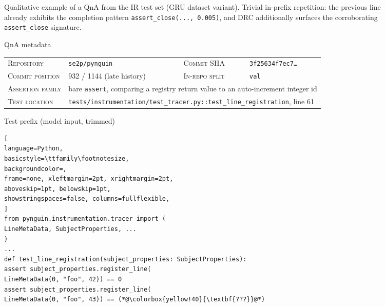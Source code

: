 \documentclass{llmxive}
\begin{document}
\begin{figure}[!htbp]
\begin{center}
\begin{tcolorbox}
\end{tcolorbox}
\caption{Qualitative example of a QnA from the IR test set (GRU dataset variant). Trivial in-prefix repetition: the previous line already exhibits the completion pattern \texttt{assert\_close(...,\,0.005)}, and DRC additionally surfaces the corroborating \texttt{assert\_close} signature.}
\label{fig:qualitative_ir_fla_46}
\end{center}
\end{figure}

\begin{figure}[!htbp]
\begin{center}
\begin{tcolorbox}[
enhanced,
colback=white, colframe=qexHead, coltitle=white,
fonttitle=\bfseries,
title={Detailed qualitative example: \texttt{se2p/pynguin} (IR test, commit-derived)},
arc=3pt, boxrule=0.6pt,
top=3pt, bottom=3pt, left=6pt, right=6pt,
]

\begin{qexsection}{QnA metadata}
\footnotesize
\begin{tabular}{@{}l@{\;\;}l@{\hskip 14pt}l@{\;\;}l@{}}
\textsc{Repository}      & \texttt{se2p/pynguin}                       & \textsc{Commit SHA}        & \texttt{3f25634f7ec7\ldots} \\
\textsc{Commit position} & 932 / 1144 (late history)                   & \textsc{In-repo split}     & \texttt{val} \\
\textsc{Assertion family} & \multicolumn{3}{l}{bare \texttt{assert}, comparing a registry return value to an auto-increment integer id} \\
\textsc{Test location}   & \multicolumn{3}{l}{\texttt{tests/instrumentation/test\_tracer.py::test\_line\_registration}, line 61} \\
\end{tabular}
\end{qexsection}

\begin{qexsection}{Test prefix (model input, trimmed)}
\begin{lstlisting}[
language=Python,
basicstyle=\ttfamily\footnotesize,
backgroundcolor=,
frame=none, xleftmargin=2pt, xrightmargin=2pt,
aboveskip=1pt, belowskip=1pt,
showstringspaces=false, columns=fullflexible,
]
from pynguin.instrumentation.tracer import (
LineMetaData, SubjectProperties, ...
)
...
def test_line_registration(subject_properties: SubjectProperties):
assert subject_properties.register_line(
LineMetaData(0, "foo", 42)) == 0
assert subject_properties.register_line(
LineMetaData(0, "foo", 43)) == (*@\colorbox{yellow!40}{\textbf{???}}@*)
\end{lstlisting}
\end{qexsection}


\end{tcolorbox}
\end{center}
\end{figure}
\end{document}
